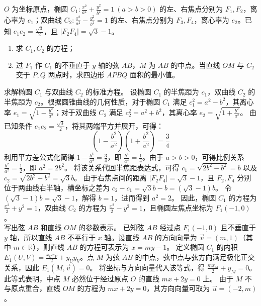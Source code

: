 \begin{example}
\(O\) 为坐标原点，椭圆 \(C_1: \frac{x^2}{a^2} + \frac{y^2}{b^2} = 1\ (a > b > 0)\) 的左、右焦点分别为 \(F_1,F_2\)，离心率为 \(e_1\)；双曲线 \(C_2: \frac{x^2}{a^2} - \frac{y^2}{b^2} = 1\) 的左、右焦点分别为 \(F_3,F_4\)，离心率为 \(e_2\)。已知 \(e_1e_2 = \frac{\sqrt{3}}{2}\)，且 \(|F_2F_4| = \sqrt{3} - 1\)。
\begin{enumerate}
    \item[(1)] 求 \(C_1,C_2\) 的方程；
    \item[(2)] 过 \(F_1\) 作 \(C_1\) 的不垂直于 \(y\) 轴的弦 \(AB\)，\(M\) 为 \(AB\) 的中点。当直线 \(OM\) 与 \(C_2\) 交于 \(P,Q\) 两点时，求四边形 \(APBQ\) 面积的最小值。
\end{enumerate}
\end{example}
\begin{solution}
求解椭圆 $C_1$ 与双曲线 $C_2$ 的标准方程。
设椭圆 $C_1$ 的半焦距为 $c_1$，双曲线 $C_2$ 的半焦距为 $c_2$。根据圆锥曲线的几何性质，对于椭圆 $C_1$ 满足 $c_1^2 = a^2 - b^2$，其离心率 $e_1 = \sqrt{1 - \frac{b^2}{a^2}}$；对于双曲线 $C_2$ 满足 $c_2^2 = a^2 + b^2$，其离心率 $e_2 = \sqrt{1 + \frac{b^2}{a^2}}$。
由已知条件 $e_1 e_2 = \frac{\sqrt{3}}{2}$，将其两端平方并展开，可得：
\[ \left(1 - \frac{b^2}{a^2}\right)\left(1 + \frac{b^2}{a^2}\right) = \frac{3}{4} \]
利用平方差公式化简得 $1 - \frac{b^4}{a^4} = \frac{3}{4}$，即 $\frac{b^4}{a^4} = \frac{1}{4}$。由于 $a > b > 0$，可得比例关系 $\frac{b^2}{a^2} = \frac{1}{2}$，即 $a^2 = 2b^2$。
将该关系代回半焦距表达式，可得 $c_1 = \sqrt{2b^2 - b^2} = b$ 以及 $c_2 = \sqrt{2b^2 + b^2} = \sqrt{3}b$。
由于右焦点间的距离 $|F_2 F_4| = \sqrt{3} - 1$，且 $F_2, F_4$ 分别位于两曲线右半轴，横坐标之差为 $c_2 - c_1 = \sqrt{3}b - b = (\sqrt{3} - 1)b$。
令 $(\sqrt{3} - 1)b = \sqrt{3} - 1$，解得 $b = 1$，进而得到 $a^2 = 2$。
因此，椭圆 $C_1$ 的方程为 $\frac{x^2}{2} + y^2 = 1$，双曲线 $C_2$ 的方程为 $\frac{x^2}{2} - y^2 = 1$，且椭圆左焦点坐标为 $F_1(-1, 0)$。\\
写出弦 $AB$ 和直线 $OM$ 的参数表示。
已知弦 $AB$ 经过点 $F_1(-1,0)$ 且不垂直于 $y$ 轴，所以直线 $AB$ 不平行于 $x$ 轴。设直线 $AB$ 的方向向量为 $\vec{v} = (m, 1)$（其中 $m \in \mathbb{R}$），则直线 $AB$ 的方程可表示为 $x = my - 1$。
定义椭圆 $C_1$ 的内积 $E_1(U, V) = \frac{x_U x_V}{2} + y_U y_V$。点 $M$ 为弦 $AB$ 的中点，弦中点与弦方向满足极化正交关系，因此 $E_1(M, \vec{v}) = 0$。
将坐标与方向向量代入该等式，得 $\frac{m x_M}{2} + y_M = 0$。此等式表明，中点 $M$ 必然位于经过原点 $O$ 的直线 $m x + 2y = 0$ 上。
由于 $M$ 不与原点重合，直线 $OM$ 的方程为 $m x + 2y = 0$，其方向向量可取为 $\vec{u} = (-2, m)$。\\

\end{solution}
